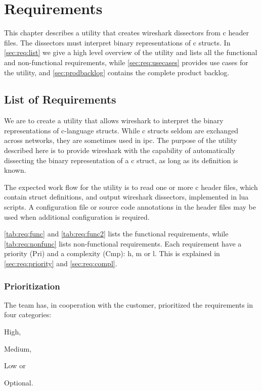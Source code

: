 \chapter{Requirements}
\label{chap:req:requirements}
This chapter describes a \gls{utility} that creates \Gls{wireshark} \glspl{dissector} from \Gls{c}
\gls{header} files. The \glspl{dissector} must interpret \gls{binary} representations of \Gls{c}
\glspl{struct}. In \autoref{sec:req:list} we give a high level overview of the
\gls{utility} and lists all the functional and non-functional requirements, 
while \autoref{sec:req:usecases} provides use cases for the \gls{utility}, 
and \autoref{sec:prodbacklog} contains the complete product backlog.


\section{List of Requirements}
\label{sec:req:list}
We are to create a \gls{utility} that allows \Gls{wireshark} to interpret the \gls{binary}
representations of \Gls{c}-language \glspl{struct}. While \Gls{c} \glspl{struct} seldom are exchanged
across networks, they are sometimes used in \gls{ipc}. The
purpose of the \gls{utility} described here is to provide \Gls{wireshark} with the
capability of automatically dissecting the \gls{binary} representation of a \Gls{c} \gls{struct},
as long as its definition is known.

The expected work flow for the \gls{utility} is to read one or more \Gls{c} \gls{header} files,
which contain \gls{struct} definitions, and output \Gls{wireshark} \glspl{dissector}, implemented
in \Gls{lua} scripts. A configuration file or source code annotations in the \gls{header}
files may be used when additional configuration is required.

\autoref{tab:req:func} and \autoref{tab:req:func2} lists the functional requirements,
while \autoref{tab:req:nonfunc} lists non-functional requirements.
Each requirement have a priority (Pri) and a complexity (Cmp): \Gls{h}, 
\Gls{m} or \Gls{l}. This is explained in \autoref{sec:req:priority}
and \autoref{sec:req:compl}.

\subsection{Prioritization}
\label{sec:req:priority}
The team has, in cooperation with the customer, prioritized the requirements
in four categories:
\begin{inparaenum}
	\item High,
	\item Medium,
	\item Low or
	\item Optional.
\end{inparaenum} 

